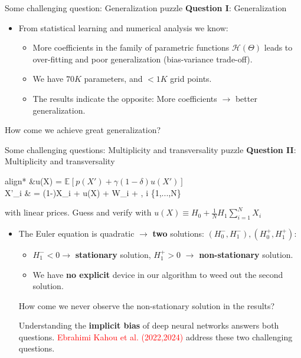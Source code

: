 \documentclass[aspectratio=169,10pt]{beamer}
\newcommand{\emphcolor}[1]{\textbf{\textcolor{emphcolorval}{#1}}}
\newcommand{\expec}[2][]{\ensuremath{\mathbb{E}_{{#1}}\left[ {#2} \right]}}
\begin{document}
\begin{frame}{Some challenging question: Generalization puzzle}
	\emphcolor{Question I}: Generalization 
	\begin{itemize}
		\item From statistical learning and numerical analysis we know:\vspace{0.1in}
		\begin{itemize}
			\item More coefficients in the family of parametric functions $\mathcal{H}(\Theta)$ leads to over-fitting and poor generalization (bias-variance trade-off).\vspace{0.1in}
		  \item We have $70K$ parameters, and $<1K$ grid points.\vspace{0.1in}
			\item The results indicate the opposite: More coefficients $\rightarrow$ better generalization.  \vspace{0.1in}
		\end{itemize}
	\end{itemize}
How come we achieve great generalization?  
\end{frame}

\begin{frame}{Some challenging questions: Multiplicity and transversality puzzle}
\emphcolor{Question II}: Multiplicity and transversality 
	\begin{empheq}[box=\tcbhighmath]{align*}
		&\gamma u(X) = \beta \expec{p(X')+\gamma (1-\delta) u(X') }\\
		  X'_i & = (1-\delta)X_i + u(X) + \sigma W_i + \eta \omega,\quad{} i \in \{1,...,N\}
	\end{empheq}
with linear prices. Guess and verify with $u(X) \equiv H_0 + \frac{1}{N} H_1 \sum_{i=1}^N X_i$  
\begin{itemize}
		\item The Euler equation is quadratic $\rightarrow$ \emphcolor{two} solutions: $(H_0^-, H_1^-), (H_0^+, H_1^+)$:\vspace{0.1in}
	\begin{itemize}
		\item $H_1^- <0 \rightarrow$  \emphcolor{stationary} solution, $H_1^+ > 0$ $\rightarrow$ \emphcolor{non-stationary} solution. \vspace{0.1in}
		\item We have \emphcolor{no explicit} device in our algorithm to weed out the second solution. \vspace{0.1in}
	\end{itemize}
	How come we never observe the non-stationary solution in the results? 
	\vspace{0.1in}
	
	Understanding the \emphcolor{implicit bias} of deep neural networks answers both questions.  \textcolor{red}{Ebrahimi Kahou et al. (2022,2024)} address these two challenging questions. 
\end{itemize}
\end{frame}	
				
\end{document}
